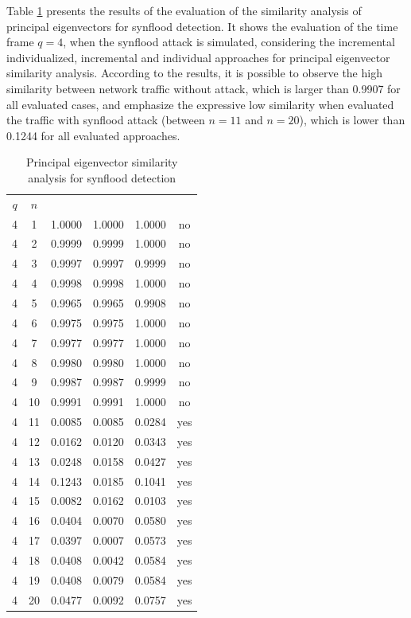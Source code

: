 Table \ref{tab:2.06} presents the results of the evaluation of the similarity analysis of principal eigenvectors for synflood detection. It shows the evaluation of the time frame $q=4$, when the synflood attack is simulated, considering the incremental individualized, incremental and individual approaches for principal eigenvector similarity analysis. According to the results, it is possible to observe the high similarity between network traffic without attack, which is larger than 0.9907 for all evaluated cases, and emphasize the expressive low similarity when evaluated the traffic with synflood attack (between $n=11$ and $n=20$), which is lower than 0.1244 for all evaluated approaches.

\begin{table}[h!]
  \centering
  \footnotesize
  \caption{Principal eigenvector similarity analysis for synflood detection}
  \label{tab:2.06}
  \begin{tabular}{ c c c c c c }
	\toprule
	\multirow{2}{*}{\pmb{Time Frame} $q$} &\multirow{2}{*}{\pmb{Time} $n$}   &\multicolumn{3}{c}{\pmb{Similarity Analysis}} &\multirow{2}{*}{\pmb{Ground Truth}}\\ 
			\hhline{~~---~}
			& &\pmb{Incremental Individualized} &\pmb{Incremental} &\pmb{Individual}\\
	\midrule
	4 &1 &1.0000 &1.0000 &1.0000 &no \\
	4 &2 &0.9999 &0.9999 &1.0000 &no \\
	4 &3 &0.9997 &0.9997 &0.9999 &no \\
	4 &4 &0.9998 &0.9998 &1.0000 &no \\
	4 &5 &0.9965 &0.9965 &0.9908 &no \\
	4 &6 &0.9975 &0.9975 &1.0000 &no \\
	4 &7 &0.9977 &0.9977 &1.0000 &no \\
	4 &8 &0.9980 &0.9980 &1.0000 &no \\
	4 &9 &0.9987 &0.9987 &0.9999 &no \\
	4 &10 &0.9991 &0.9991 &1.0000 &no \\
	4 &11 &0.0085 &0.0085 &0.0284 &yes \\
	4 &12 &0.0162 &0.0120 &0.0343 &yes \\
	4 &13 &0.0248 &0.0158 &0.0427 &yes \\
	4 &14 &0.1243 &0.0185 &0.1041 &yes \\
	4 &15 &0.0082 &0.0162 &0.0103 &yes \\
	4 &16 &0.0404 &0.0070 &0.0580 &yes \\
	4 &17 &0.0397 &0.0007 &0.0573 &yes \\
	4 &18 &0.0408 &0.0042 &0.0584 &yes \\
	4 &19 &0.0408 &0.0079 &0.0584 &yes \\
	4 &20 &0.0477 &0.0092 &0.0757 &yes \\
    \bottomrule
  \end{tabular}
\end{table}

